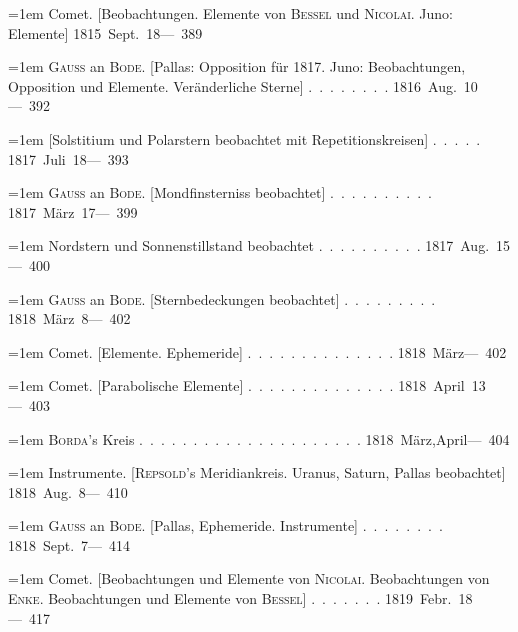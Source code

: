 \noindent\hangindent=1em Comet. [Beobachtungen. Elemente von \textsc{Bessel} und \textsc{Nicolai}. Juno: Elemente] \hfill\mbox{1815 Sept. 18}\quad\mbox{--- 389}\par\smallskip
\noindent\hangindent=1em \textsc{Gauss} an \textsc{Bode}. [Pallas: Opposition für 1817. Juno: Beobachtungen, Opposition und Elemente. Veränderliche Sterne] \mbox{.\ .\ .\ .\ .\ .\ .\ .} \hfill\mbox{1816 Aug. 10}\quad\mbox{--- 392}\par\smallskip
\noindent\hangindent=1em [Solstitium und Polarstern beobachtet mit Repetitionskreisen] \mbox{.\ .\ .\ .\ .} \hfill\mbox{1817 Juli 18}\quad\mbox{--- 393}\par\smallskip
\noindent\hangindent=1em \textsc{Gauss} an \textsc{Bode}. [Mondfinsterniss beobachtet] \mbox{.\ .\ .\ .\ .\ .\ .\ .\ .\ .} \hfill\mbox{1817 März 17}\quad\mbox{--- 399}\par\smallskip
\noindent\hangindent=1em \hspace{1em}Nordstern und Sonnenstillstand beobachtet \mbox{.\ .\ .\ .\ .\ .\ .\ .\ .\ .} \hfill\mbox{1817 Aug. 15}\quad\mbox{--- 400}\par\smallskip
\noindent\hangindent=1em \textsc{Gauss} an \textsc{Bode}. [Sternbedeckungen beobachtet] \mbox{.\ .\ .\ .\ .\ .\ .\ .\ .} \hfill\mbox{1818 März 8}\quad\mbox{--- 402}\par\smallskip
\noindent\hangindent=1em Comet. [Elemente. Ephemeride] \mbox{.\ .\ .\ .\ .\ .\ .\ .\ .\ .\ .\ .\ .\ .} \hfill\mbox{1818 März}\quad\mbox{--- 402}\par\smallskip
\noindent\hangindent=1em Comet. [Parabolische Elemente] \mbox{.\ .\ .\ .\ .\ .\ .\ .\ .\ .\ .\ .\ .\ .} \hfill\mbox{1818 April 13}\quad\mbox{--- 403}\par\smallskip
\noindent\hangindent=1em \textsc{Borda}'s Kreis \mbox{.\ .\ .\ .\ .\ .\ .\ .\ .\ .\ .\ .\ .\ .\ .\ .\ .\ .\ .\ .\ .} \hfill\mbox{1818 März,April}\quad\mbox{--- 404}\par\smallskip
\noindent\hangindent=1em Instrumente. [\textsc{Repsold}'s Meridiankreis. Uranus, Saturn, Pallas beobachtet] \hfill\mbox{1818 Aug. 8}\quad\mbox{--- 410}\par\smallskip
\noindent\hangindent=1em \textsc{Gauss} an \textsc{Bode}. [Pallas, Ephemeride. Instrumente] \mbox{.\ .\ .\ .\ .\ .\ .\ .} \hfill\mbox{1818 Sept. 7}\quad\mbox{--- 414}\par\smallskip
\noindent\hangindent=1em Comet. [Beobachtungen und Elemente von \textsc{Nicolai}. Beobachtungen von \textsc{Enke}. Beobachtungen und Elemente von \textsc{Bessel}] \mbox{.\ .\ .\ .\ .\ .\ .} \hfill\mbox{1819 Febr. 18}\quad\mbox{--- 417}\par\smallskip
